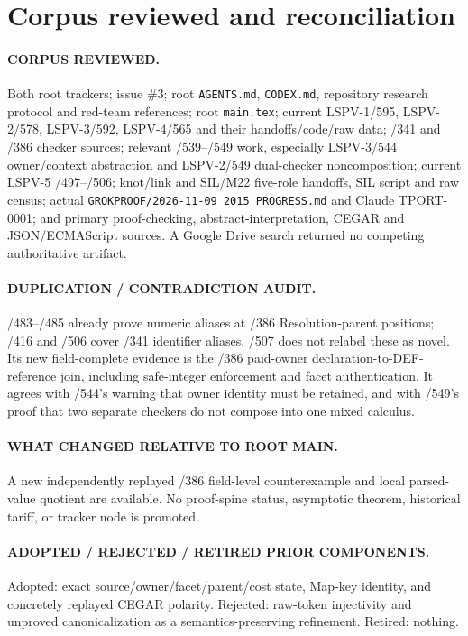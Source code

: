 \documentclass[11pt]{article}
\begin{document}
\section{Corpus reviewed and reconciliation}

\paragraph{CORPUS REVIEWED.} Both root trackers; issue \#3; root \texttt{AGENTS.md},
\texttt{CODEX.md}, repository research protocol and red-team references; root
\texttt{main.tex}; current LSPV-1/595, LSPV-2/578, LSPV-3/592, LSPV-4/565 and
their handoffs/code/raw data; /341 and /386 checker sources; relevant /539--/549
work, especially LSPV-3/544 owner/context abstraction and LSPV-2/549
dual-checker noncomposition; current LSPV-5 /497--/506; knot/link and SIL/M22
five-role handoffs, SIL script and raw census; actual
\texttt{GROKPROOF/2026-11-09\_2015\_PROGRESS.md} and Claude TPORT-0001;
and primary proof-checking, abstract-interpretation, CEGAR and
JSON/ECMAScript sources.  A Google Drive
search returned no competing authoritative artifact.

\paragraph{DUPLICATION / CONTRADICTION AUDIT.} /483--/485 already prove numeric
aliases at /386 Resolution-parent positions; /416 and /506 cover /341 identifier
aliases.  /507 does not relabel these as novel.  Its new field-complete evidence
is the /386 paid-owner declaration-to-DEF-reference join, including safe-integer
enforcement and facet authentication.  It agrees with /544's warning that owner
identity must be retained, and with /549's proof that two separate checkers do
not compose into one mixed calculus.

\paragraph{WHAT CHANGED RELATIVE TO ROOT MAIN.} A new independently replayed
/386 field-level counterexample and local parsed-value quotient are available.
No proof-spine status, asymptotic theorem, historical tariff, or tracker node is
promoted.

\paragraph{ADOPTED / REJECTED / RETIRED PRIOR COMPONENTS.} Adopted: exact
source/owner/facet/parent/cost state, Map-key identity, and concretely replayed
CEGAR polarity.  Rejected: raw-token injectivity and unproved canonicalization as
a semantics-preserving refinement.  Retired: nothing.
\end{document}
